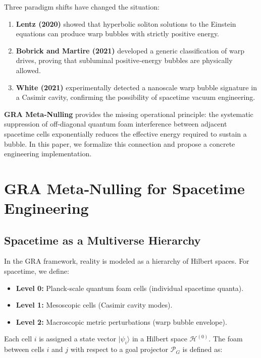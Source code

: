 \documentclass[11pt]{article}
\begin{document}
Three paradigm shifts have changed the situation:

\begin{enumerate}
    \item \textbf{Lentz (2020)} showed that hyperbolic soliton solutions to the Einstein equations can produce warp bubbles with strictly positive energy.
    \item \textbf{Bobrick and Martire (2021)} developed a generic classification of warp drives, proving that subluminal positive‑energy bubbles are physically allowed.
    \item \textbf{White (2021)} experimentally detected a nanoscale warp bubble signature in a Casimir cavity, confirming the possibility of spacetime vacuum engineering.
\end{enumerate}

\textbf{GRA Meta‑Nulling} provides the missing operational principle: the systematic suppression of off‑diagonal quantum foam interference between adjacent spacetime cells exponentially reduces the effective energy required to sustain a bubble. In this paper, we formalize this connection and propose a concrete engineering implementation.

\section{GRA Meta‑Nulling for Spacetime Engineering}

\subsection{Spacetime as a Multiverse Hierarchy}

In the GRA framework, reality is modeled as a hierarchy of Hilbert spaces. For spacetime, we define:

\begin{itemize}
    \item \textbf{Level 0:} Planck‑scale quantum foam cells (individual spacetime quanta).
    \item \textbf{Level 1:} Mesoscopic cells (Casimir cavity modes).
    \item \textbf{Level 2:} Macroscopic metric perturbations (warp bubble envelope).
\end{itemize}

Each cell $i$ is assigned a state vector $|\psi_i\rangle$ in a Hilbert space $\mathcal{H}^{(0)}$. The foam between cells $i$ and $j$ with respect to a goal projector $\mathcal{P}_G$ is defined as:
\end{document}
